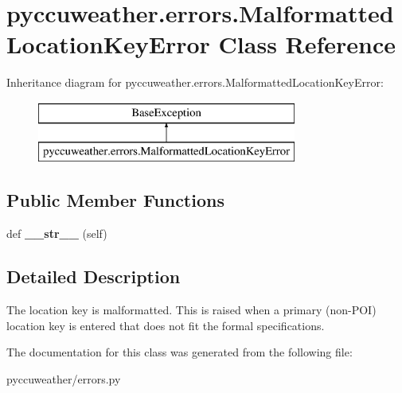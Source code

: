 \hypertarget{classpyccuweather_1_1errors_1_1_malformatted_location_key_error}{}\section{pyccuweather.\+errors.\+Malformatted\+Location\+Key\+Error Class Reference}
\label{classpyccuweather_1_1errors_1_1_malformatted_location_key_error}
Inheritance diagram for pyccuweather.\+errors.\+Malformatted\+Location\+Key\+Error\+:\begin{figure}[H]
\begin{center}
\leavevmode
\includegraphics[height=2.000000cm]{classpyccuweather_1_1errors_1_1_malformatted_location_key_error}
\end{center}
\end{figure}
\subsection*{Public Member Functions}
\begin{DoxyCompactItemize}
\item 
\hypertarget{classpyccuweather_1_1errors_1_1_malformatted_location_key_error_a4f66007a86cecc6fcd3273f9e6947ad4}{}def {\bfseries \+\_\+\+\_\+str\+\_\+\+\_\+} (self)\label{classpyccuweather_1_1errors_1_1_malformatted_location_key_error_a4f66007a86cecc6fcd3273f9e6947ad4}

\end{DoxyCompactItemize}


\subsection{Detailed Description}
\begin{DoxyVerb}The location key is malformatted. This is raised when a primary (non-POI) location key is entered that does not fit
the formal specifications.
\end{DoxyVerb}
 

The documentation for this class was generated from the following file\+:\begin{DoxyCompactItemize}
\item 
pyccuweather/errors.\+py\end{DoxyCompactItemize}
